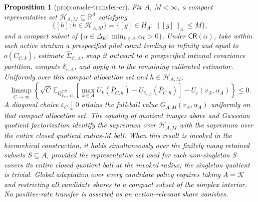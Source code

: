 \documentclass{article}
\newtheorem{proposition}{Proposition}
\begin{document}
\begin{proposition}[prop:oracle-transfer-cr]\label{prop:oracle-transfer-cr}
Fix \(A\), \(M<\infty\), a compact representative set \(\mathscr H_{A,M}\subseteq\mathbb R^A\) satisfying
\[
\{[h]:h\in\mathscr H_{A,M}\}
=\{[g]\in H_A:\lVert[g]\rVert_A\leq M\},
\]
and a compact subset of \(\{\alpha\in\Delta_K:\min_{k\in A}\alpha_k>0\}\).  Under \(\mathsf{CR}(\alpha)\), take within each active stratum a prespecified pilot count tending to infinity and equal to \(o(C_{C,k})\), estimate \(\widehat\Sigma_{C,A}\), snap it outward to a prespecified rational covariance partition, compute \(\delta_{\varepsilon,A}\), and apply it to the remaining calibrated estimator.  Uniformly over this compact allocation set and \(h\in\mathscr H_{A,M}\),
\[
\limsup_{C\to\infty}\left\{\sqrt C\,\mathbb E_{Q^{CR}_{\bar P_{C,h},C_C}}
\left[\max_{k\in A}U_k(\bar P_{C,h})-U_{\delta_{\varepsilon,A}}(\bar P_{C,h})\right]
-U_\varepsilon(v_A,\alpha_A)\right\}\leq0.
\]
A diagonal choice \(\varepsilon_C\downarrow0\) attains the full-ball value \(G_{A,M}(v_A,\alpha_A)\) uniformly on that compact allocation set.  The equality of quotient images above and Gaussian quotient factorization identify the supremum over \(\mathscr H_{A,M}\) with the supremum over the entire closed quotient radius-\(M\) ball.  When this result is invoked in the hierarchical construction, it holds simultaneously over the finitely many retained subsets \(S\subseteq A\), provided the representative set used for each non-singleton \(S\) covers its entire closed quotient ball at the invoked radius; the singleton quotient is trivial.  Global adaptation over every candidate policy requires taking \(A=\mathcal K\) and restricting all candidate shares to a compact subset of the simplex interior.  No positive-rate transfer is asserted as an action-relevant share vanishes.
\end{proposition}
\end{document}
